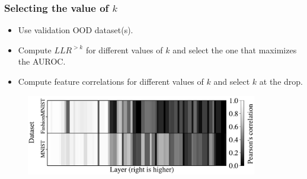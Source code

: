 \begin{frame}
    \frametitle{Selecting the value of $k$}
    \begin{itemize}
        \item Use validation OOD dataset(s).
        \item Compute $LLR^{>k}$ for different values of $k$ and select the one that maximizes the AUROC.
        \item Compute feature correlations for different values of $k$ and select $k$ at the drop.
    \end{itemize}
    \begin{figure}
        \centering
        \includegraphics[width=0.9\textwidth]{../graphics/paper_hierarchical/feature-correlation-heatmap2.pdf}
    \end{figure}
\end{frame}


